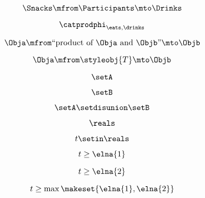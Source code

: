 \begin{forslides}
    \begin{equation}
        \label{eq:feedback-056}
        \Snacks \mfrom  \Participants \mto \Drinks
    \end{equation}

    \begin{equation}
        \label{eq:feedback-057}
        \catprodphi_{\eats,\drinks}
    \end{equation}

    \begin{equation}
        \label{eq:feedback-058}
        \Obja \mfrom \text{``product of } \Obja \text{ and } \Objb \text{''}  \mto \Objb
    \end{equation}

    \begin{equation}
        \label{eq:feedback-059}
        \Obja \mfrom \styleobj{T} \mto \Objb
    \end{equation}

    \begin{equation}
        \label{eq:feedback-060}
        \setA
    \end{equation}

    \begin{equation}
        \label{eq:feedback-061}
        \setB
    \end{equation}

    \begin{equation}
        \label{eq:feedback-062}
        \setA \setdisunion \setB
    \end{equation}

    \begin{equation}
        \label{eq:feedback-063}
        \reals
    \end{equation}

    \begin{equation}
        \label{eq:feedback-064}
        t \setin \reals
    \end{equation}

    \begin{equation}
        \label{eq:feedback-065}
        t \geq \elna{1}
    \end{equation}

    \begin{equation}
        \label{eq:feedback-066}
        t \geq \elna{2}
    \end{equation}

    \begin{equation}
        \label{eq:feedback-067}
        t \geq \max \makeset{ \elna{1}, \elna{2} }
    \end{equation}


\end{forslides}
